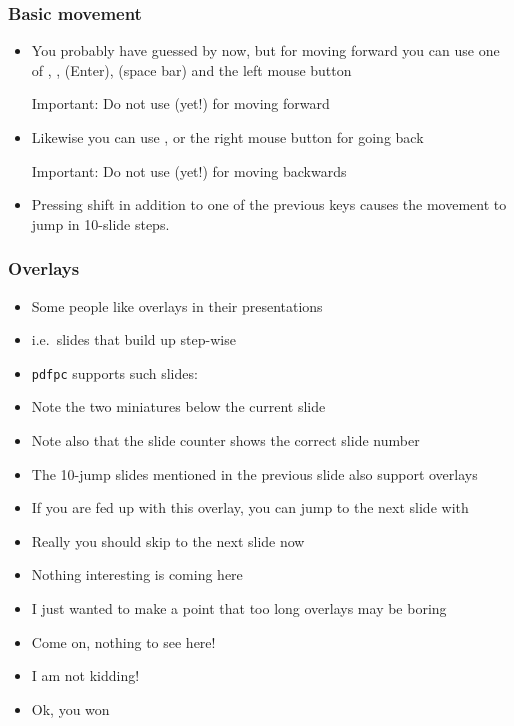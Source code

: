 \documentclass{beamer}
\newcommand{\pdfpc}{\texttt{pdfpc}\xspace}
\begin{document}
\begin{frame}
  \frametitle{Basic movement}
  \begin{itemize}
    \item You probably have guessed by now, but for moving forward you can use
      one of \RArrow, \PgDown, \Return (Enter), \Spacebar (space bar) and the left mouse
      button

      \alert{Important:} Do not use \DArrow (yet!) for moving forward
    \item Likewise you can use \LArrow, \PgUp or the right mouse button for
      going back

      \alert{Important:} Do not use \UArrow (yet!) for moving backwards
    \item Pressing shift in addition to one of the previous keys
      causes the movement to jump in 10-slide steps.
  \end{itemize}
\end{frame}

\begin{frame}
  \frametitle{Overlays}
  \begin{itemize}
    \item Some people like overlays in their presentations
    \pause
    \item i.e.\ slides that build up step-wise
    \pause
    \item \pdfpc supports such slides:
    \pause
    \item Note the two miniatures below the current slide
    \pause
    \item Note also that the slide counter shows the correct slide number
    \pause
    \item The 10-jump slides mentioned in the previous slide also support
      overlays
    \pause
    \item If you are fed up with this overlay, you can jump to the next slide
      with \DArrow
    \pause
    \item Really you should skip to the next slide now
    \pause
    \item Nothing interesting is coming here
    \pause
    \item I just wanted to make a point that too long overlays may be boring
    \pause
    \item Come on, nothing to see here!
    \pause
    \item I am not kidding!
    \pause
    \item Ok, you won
  \end{itemize}
\end{frame}
\end{document}
